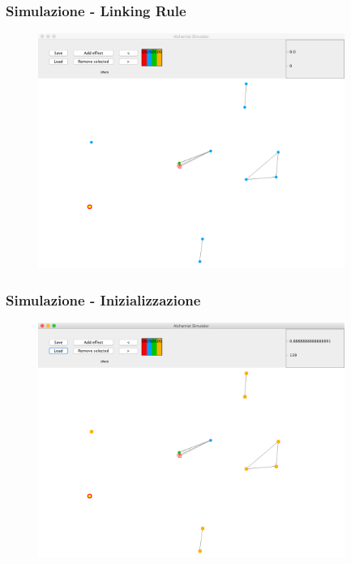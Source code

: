 \documentclass[handout]{beamer}\mode<presentation>{\usetheme{AMSCesenaBleu}}
\begin{document}

\begin{frame}
\frametitle{Simulazione - Linking Rule}
\vspace*{-0.25cm}
\begin{figure}
\includegraphics[width=10cm]{images/simul_link.png}
\end{figure}
\end{frame}

\begin{frame}
\frametitle{Simulazione - Inizializzazione}
\vspace*{-0.25cm}
\begin{figure}
\includegraphics[width=10cm]{images/simul_init.png}
\end{figure}
\end{frame}
\end{document}
